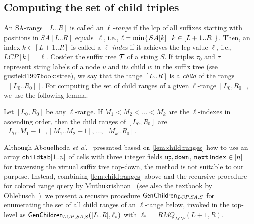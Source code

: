 \subsection{Computing the set of child triples}
\label{sec:algo:branch}
An SA-range $[L..R]$ is called an \textit{$\ell$-range} if the lcp of all suffixes starting  with positions in $SA[L..R]$ equals~$\ell$, i.e.,
$\ell = \min\{\kern0.2em SA[k] \mid k \in [L+1..R] \kern0.2em\}$. 
Then, an index $k \in [L+1..R]$ is called a \textit{$\ell$-index} if it achieves the lcp-value $\ell$, i.e., $LCP[k] = \ell$.
Cosider the suffix tree $\mathcal{T}$ of a string $S$.
If triples $\tau_0$ and $\tau$ represent string labels of a node $u$ and its child $w$ in the suffix tree (see gusfield1997book:stree), we say that the range $[L..R]$ is a \textit{child} of the range $[[L_0..R_0]]$. 
For computing the set of child ranges of a given $\ell$-range $[L_0, R_0]$, we use the following lemma.

\begin{lemma}\label{lem:child:ranges}
  Let $[L_0, R_0]$ be any $\ell$-range.
  If $M_1 < M_2 < \dots < M_k$ are the $\ell$-indexes in ascending order, then the child ranges of $[L_0, R_0]$ are
  $[L_0..M_1-1], 
   [M_1..M_2-1], 
   \ldots,
   [M_k..R_0]$.  
\end{lemma}

Although Abouelhoda \textit{et al.}~\cite{abouelhoda2004replacing} presented based on \cref{lem:child:ranges} how to use an array $\mathtt{childtab}[1..n]$ of cells with three integer fields $\mathtt{up}, \mathtt{down}$, $\mathtt{nextIndex} \in [n]$ for traversing the virtual suffix tree top-down, the method is not suitable to our purpose. 
Instead, combining \cref{lem:child:ranges} above and the recursive procedure for colored range query by Muthukrishnan~\cite{muthukrishnan2002efficient} (see also the textbook by Ohlebusch~\cite{ohlebusch2013bookbioinfo}), we present a recusive procedure $\textsf{GenChildren}_{{\mathit{LCP}, \mathit{SA}, S}}$ for enumerating the set of all child ranges of an $\ell$-range below, invoked in the top-level as $\textsf{GenChildren}_{{\mathit{LCP}, \mathit{SA}, S}}([L..R], \ell_*)$ with $\ell_* = RMQ_{LCP}(L+1, R)$. 

